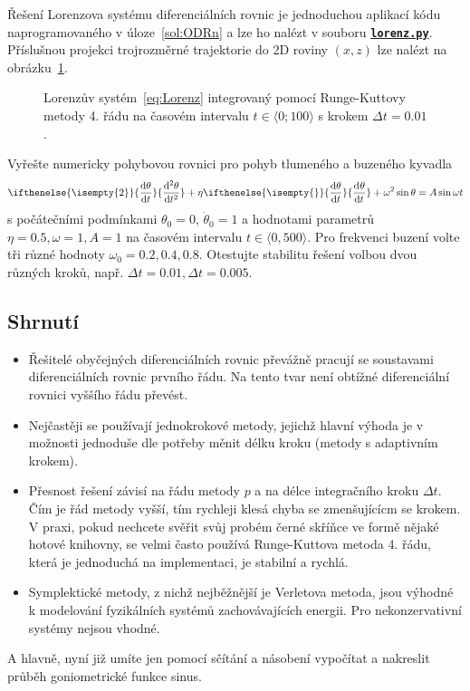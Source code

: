 \documentclass[a4paper,11pt,twoside]{article}
\renewcommand{\d}{\mathrm{d}}           %
\newcommand{\derivative}[3][]{\ifthenelse{\isempty{#1}}	    %
	{\frac{\d{#2}}{\d{#3}}}
	{\frac{\d^{#1}{#2}}{\d{#3}^{#1}}}
}
\def\ghfile#1#2{\textnormal{\textbf{\texttt{\href{https://github.com/PavelStransky/PCInPhysics/blob/main/#1#2}{#2}}}}}
\theoremstyle{red}
\theoremstyle{green}
\begin{document}
\begin{solution}
    Řešení Lorenzova systému diferenciálních rovnic je jednoduchou aplikací kódu naprogramovaného v úloze~\ref{sol:ODRn} a lze ho nalézt v souboru \ghfile{python/ode/}{lorenz.py}.
    Příslušnou projekci trojrozměrné trajektorie do 2D roviny $(x,z)$ lze nalézt na obrázku~\ref{fig:Lorenz}.

    \begin{figure}[!htbp]
        \centering
        \caption{
            \protect\small
                Lorenzův systém~\eqref{eq:Lorenz} integrovaný pomocí Runge-Kuttovy metody 4. řádu na časovém intervalu $t\in\langle0;100\rangle$ s krokem $\Delta t=0.01$.
            }	
        \label{fig:Lorenz}
    \end{figure}
\end{solution}

\begin{task}
    Vyřešte numericky pohybovou rovnici pro pohyb tlumeného a buzeného kyvadla
    \begin{equation}
        \derivative[2]{\theta}{t}+\eta\derivative{\theta}{t}+\omega^{2}\sin{\theta}=A\sin{\omega t}
    \end{equation}
    s počátečními podmínkami $\theta_{0}=0$, $\dot{\theta}_{0}=1$ a hodnotami parametrů
    $\eta=0.5,\omega=1,A=1$ na časovém intervalu $t\in\langle0,500\rangle$.    
    Pro frekvenci buzení volte tři různé hodnoty $\omega_0=0.2,0.4,0.8$.
    Otestujte stabilitu řešení volbou dvou různých kroků, např. $\Delta t=0.01,\Delta t=0.005$.
\end{task}

\subsection{Shrnutí}
\begin{itemize}
\item 
    Řešitelé obyčejných diferenciálních rovnic převážně pracují se soustavami diferenciálních rovnic prvního řádu.
    Na tento tvar není obtížné diferenciální rovnici vyššího řádu převést.

\item
    Nejčastěji se používají jednokrokové metody, jejichž hlavní výhoda je v možnosti jednoduše dle potřeby měnit délku kroku (metody s adaptivním krokem).

\item 
    Přesnost řešení závisí na řádu metody $p$ a na délce integračního kroku $\Delta t$.
    Čím je řád metody vyšší, tím rychleji klesá chyba se zmenšujícícm se krokem.
    V praxi, pokud nechcete svěřit svůj probém černé skříňce ve formě nějaké hotové knihovny, se velmi často používá Runge-Kuttova metoda 4. řádu, která je jednoduchá na implementaci, je stabilní a rychlá.

\item
    Symplektické metody, z nichž nejběžnější je Verletova metoda, jsou výhodné k modelování fyzikálních systémů zachovávajících energii.
    Pro nekonzervativní systémy nejsou vhodné. 
\end{itemize}
A hlavně, nyní již umíte jen pomocí sčítání a násobení vypočítat a nakreslit průběh goniometrické funkce sinus.
\end{document}
